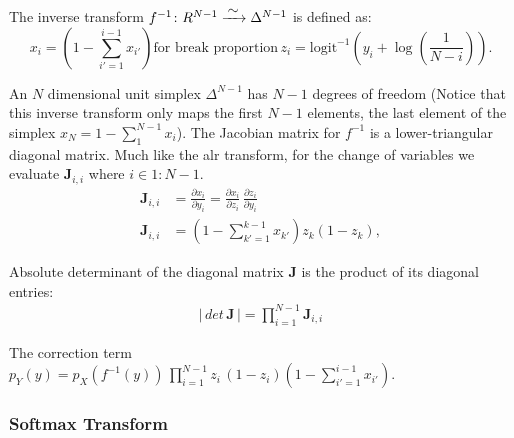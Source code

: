 \documentclass[11pt]{article}
\newcommand{\abs}[1]{\left| #1 \right|}
\begin{document}
The inverse transform $ f^{-1} \colon R^{N-1} \xrightarrow{\makebox[0.4cm]{$\sim$}}  \Delta^{N-1}$ is defined as:
\[
x_i =
\left( 1 - \sum_{i'=1}^{i-1} x_{i'} \right) \text{for break proportion} \, z_i = \mathrm{logit}^{-1} \left( y_i
                             + \log \left( \frac{1}{N - i}
                                            \right)\right).
                                            \]
                            
An $N$ dimensional unit simplex $\Delta^{N-1}$ has $N-1$ degrees of freedom (Notice that this inverse transform only maps the first $N-1$ elements, the last element of the simplex $x_{N} = 1 - \sum_1^{N-1}{x_i}$). The Jacobian matrix for $f^{-1}$ is a lower-triangular diagonal matrix. Much like the alr transform, for the change of variables we evaluate $\mathbf{J}_{i, i}$ where $i \in 1:N-1$.
\begin{align*}
\mathbf{J}_{i, i} &= \frac{\partial x_i}{\partial y_i}
=
\frac{\partial x_i}{\partial z_i} \,
\frac{\partial z_i}{\partial y_i}\\
\mathbf{J}_{i, i} &= \left(
  1 - \sum_{k' = 1}^{k-1} x_{k'}
   \right) z_k (1 - z_k),
\end{align*}

Absolute determinant of the diagonal matrix $\mathbf{J}$ is the product of its diagonal entries:
\begin{align*}
	\abs{\, det \, \textbf{J} \,} = \prod_{i=1}^{N-1} \textbf{J}_{i,i}
\end{align*}

The correction term $p_Y(y) = p_X(f^{-1}(y))\,
\prod_{i=1}^{N-1}z_i\,(1 - z_i)\left(1 - \sum_{i'=1}^{i-1} x_{i'}\right).$
\subsubsection{Softmax Transform}
\end{document}
